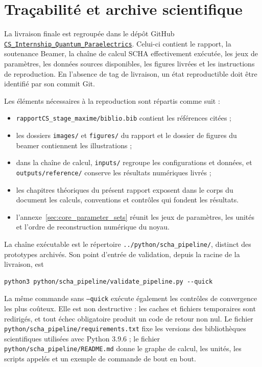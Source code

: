 \section{Traçabilité et archive scientifique}
\label{ann:tracabilite}

La livraison finale est regroupée dans le dépôt GitHub
\href{https://github.com/MaximDP/CS_Internship_Quantum_Paraelectrics}
{\nolinkurl{CS_Internship_Quantum_Paraelectrics}}. Celui-ci contient le rapport,
la soutenance Beamer, la chaîne de calcul SCHA effectivement exécutée, les jeux
de paramètres, les données sources disponibles, les figures livrées et les
instructions de reproduction. En l'absence de tag de livraison, un état
reproductible doit être identifié par son commit Git.

Les éléments nécessaires à la reproduction sont répartis comme suit :
\begin{itemize}
  \item \texttt{rapportCS\_stage\_maxime/biblio.bib} contient les références citées ;
  \item les dossiers \texttt{images/} et \texttt{figures/} du rapport et
  le dossier de figures du beamer contiennent les illustrations ;
  \item dans la chaîne de calcul, \texttt{inputs/} regroupe les configurations et données,
  et \texttt{outputs/reference/} conserve les résultats numériques livrés ;
  \item les chapitres théoriques du présent rapport exposent dans le corps du
  document les calculs, conventions et contrôles qui fondent les résultats.
  \item l'annexe~\ref{sec:core_parameter_sets} réunit les jeux de paramètres,
  les unités et l'ordre de reconstruction numérique du noyau.
\end{itemize}

La chaîne exécutable est le répertoire
\texttt{../python/scha\_pipeline/}, distinct des prototypes archivés. Son point
d'entrée de validation, depuis la racine de la livraison, est
\begin{verbatim}
python3 python/scha_pipeline/validate_pipeline.py --quick
\end{verbatim}
La même commande sans \texttt{--quick} exécute également les contrôles de
convergence les plus coûteux. Elle est non destructive : les caches et fichiers
temporaires sont redirigés, et tout échec obligatoire produit un code de retour
non nul. Le fichier \texttt{python/scha\_pipeline/requirements.txt} fixe les
versions des bibliothèques scientifiques utilisées avec Python 3.9.6 ; le fichier
\texttt{python/scha\_pipeline/README.md} donne le graphe de calcul, les unités,
les scripts appelés et un exemple de commande de bout en bout.

